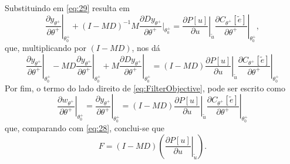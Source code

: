 Substituindo em \eqref{eq:29} resulta em
\begin{equation}
   \left.\frac{\partial y_{\theta^{+}}}{\partial \theta^{+}}\right|_{\theta_{0}^{+}}+(I-M D)^{-1} M \frac{\partial D y_{\theta^{+}}}{\partial \theta^{+}} \left.\right|_{\theta_{0}^{+}}
   =\left.\left.\frac{\partial P[u]}{\partial u}\right|_{\tilde{u}} \frac{\partial C_{\theta^{+}}[\tilde{e}]}{\partial \theta^{+}}\right|_{\theta_{0}^{+}},
\end{equation}
que, multiplicando por $(I-MD)$, nos dá
\begin{equation}
   \left.\frac{\partial y_{\theta^{+}}}{\partial \theta^{+}}\right|_{\theta_{0}^{+}}-\left.M D \frac{\partial y_{\theta^{+}}}{\partial \theta^{+}}\right|_{\theta_{0}^{+}}+\left.M \frac{\partial D y_{\theta^{+}}}{\partial \theta^{+}}\right|_{\theta_{0}^{+}}
   =\left.\left.(I-M D) \frac{\partial P[u]}{\partial u}\right|_{\tilde{u}} \frac{\partial C_{\theta^{+}}[\tilde{e}]}{\partial \theta^{+}}\right|_{\theta_{0}^{+}}
\end{equation}
Por fim, o termo do lado direito de \eqref{eq:FilterObjective}, pode ser escrito como
\begin{equation}
   \left.\frac{\partial w_{\theta^{+}}}{\partial \theta^{+}}\right|_{\theta_{0}^{+}} =\left.\frac{\partial y_{\theta^{+}}}{\partial \theta^{+}}\right|_{\theta_{0}^{+}} 
   =\left.\left.(I-M D) \frac{\partial P[u]}{\partial u}\right|_{\tilde{u}} \frac{\partial C_{\theta^{+}}[\tilde{e}]}{\partial \theta^{+}}\right|_{\theta_{0}^{+}}
\end{equation}
que, comparando com \eqref{eq:28}, conclui-se que
\begin{equation}
   F=(I-M D)\left(\left.\frac{\partial P[u]}{\partial u}\right|_{\tilde{u}}\right) .
\label{eq:FiltroFinal}
\end{equation}

